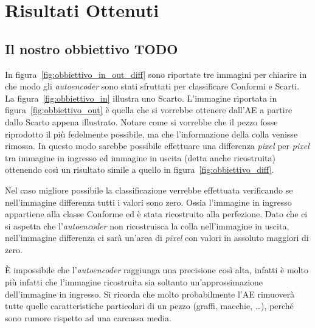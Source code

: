 
\chapter{Risultati Ottenuti}

\section{Il nostro obbiettivo TODO}
In figura~\ref{fig:obbiettivo_in_out_diff} sono riportate tre immagini per chiarire in che modo gli \textit{autoencoder} sono stati sfruttati per classificare Conformi e Scarti.
La figura~\ref{fig:obbiettivo_in} illustra uno Scarto.
L'immagine riportata in figura~\ref{fig:obbiettivo_out} è quella che si vorrebbe ottenere dall'AE a partire dallo Scarto appena illustrato.
Notare come si vorrebbe che il pezzo fosse riprodotto il più fedelmente possibile, ma che l'informazione della colla venisse rimossa.
In questo modo sarebbe possibile effettuare una differenza \textit{pixel} per \textit{pixel} tra immagine in ingresso ed immagine in uscita (detta anche ricostruita) ottenendo così un risultato simile a quello in figura~\ref{fig:obbiettivo_diff}.

Nel caso migliore possibile la classificazione verrebbe effettuata verificando se nell'immagine differenza tutti i valori sono zero.
Ossia l'immagine in ingresso appartiene alla classe Conforme ed è stata ricostruito alla perfezione.
Dato che ci si aspetta che l'\textit{autoencoder} non ricostruisca la colla nell'immagine in uscita, nell'immagine differenza ci sarà un'area di \textit{pixel} con valori in assoluto maggiori di zero.

È impossibile che l'\textit{autoencoder} raggiunga una precisione così alta, infatti è molto più infatti che l'immagine ricostruita sia soltanto un'approssimazione dell'immagine in ingresso.
Si ricorda che molto probabilmente l'AE rimuoverà tutte quelle caratteristiche particolari di un pezzo (graffi, macchie, \dots ), perché sono rumore rispetto ad una carcassa media.

